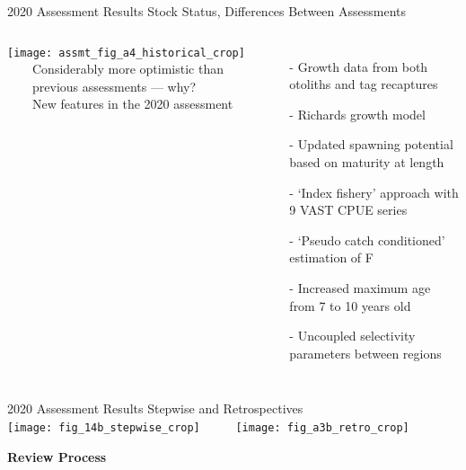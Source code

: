 \documentclass[aspectratio=169]{beamer}
\begin{document}

\begin{frame}{2020 Assessment Results}\fns
  \vspace{1ex}
  Stock Status, Differences Between Assessments\\[4ex]
  \begin{columns}
    \texttt{[image: assmt\_fig\_a4\_historical\_crop]}
    ~~~~Considerably more optimistic than\\
    ~~~~previous assessments --- why?\\[5ex]
    ~~~~New features in the 2020 assessment\\[1ex]
    \begin{itemize}\scriptsize
      \item[-] Growth data from both otoliths and tag recaptures
      \item[-] Richards growth model
      \item[-] Updated spawning potential based on maturity at length
      \item[-] `Index fishery' approach with 9 VAST CPUE series
      \item[-] `Pseudo catch conditioned' estimation of F
      \item[-] Increased maximum age from 7 to 10 years old
      \item[-] Uncoupled selectivity parameters between regions
    \end{itemize}
    \vspace{6ex}
  \end{columns}
  \vspace{1.5ex}
\end{frame}


\begin{frame}{2020 Assessment Results}\fns
  Stepwise and Retrospectives\\[3ex]
  \texttt{[image: fig\_14b\_stepwise\_crop]}~~~~~
  \texttt{[image: fig\_a3b\_retro\_crop]}
\end{frame}


\begin{frame}\Large
  \centering\darkgreen\bf
  Review Process
\end{frame}
\end{document}

